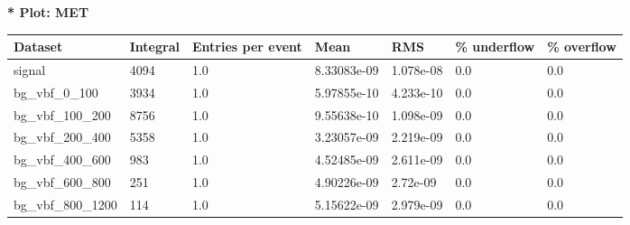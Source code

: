 \documentclass[a4paper, 10pt]{article}
\begin{document}
\textbf{* Plot: MET}\\
   \begin{table}[H]
  \begin{center}
    \begin{tabular}{|m{23.0mm}|m{23.0mm}|m{18.0mm}|m{19.0mm}|m{19.0mm}|m{19.0mm}|m{19.0mm}|}
      \hline
      {\cellcolor{yellow}         Dataset}& {\cellcolor{yellow}         Integral}& {\cellcolor{yellow}         Entries per event}& {\cellcolor{yellow}         Mean}& {\cellcolor{yellow}         RMS}& {\cellcolor{yellow}         \% underflow}& {\cellcolor{yellow}         \% overflow}\\
      \hline
      {\cellcolor{white}         signal}& {\cellcolor{white}         4094}& {\cellcolor{white}         1.0}& {\cellcolor{white}         8.33083e-09}& {\cellcolor{white}         1.078e-08}& {\cellcolor{green}         0.0}& {\cellcolor{green}         0.0}\\
      \hline
      {\cellcolor{white}         bg\_vbf\_0\_100}& {\cellcolor{white}         3934}& {\cellcolor{white}         1.0}& {\cellcolor{white}         5.97855e-10}& {\cellcolor{white}         4.233e-10}& {\cellcolor{green}         0.0}& {\cellcolor{green}         0.0}\\
      \hline
      {\cellcolor{white}         bg\_vbf\_100\_200}& {\cellcolor{white}         8756}& {\cellcolor{white}         1.0}& {\cellcolor{white}         9.55638e-10}& {\cellcolor{white}         1.098e-09}& {\cellcolor{green}         0.0}& {\cellcolor{green}         0.0}\\
      \hline
      {\cellcolor{white}         bg\_vbf\_200\_400}& {\cellcolor{white}         5358}& {\cellcolor{white}         1.0}& {\cellcolor{white}         3.23057e-09}& {\cellcolor{white}         2.219e-09}& {\cellcolor{green}         0.0}& {\cellcolor{green}         0.0}\\
      \hline
      {\cellcolor{white}         bg\_vbf\_400\_600}& {\cellcolor{white}         983}& {\cellcolor{white}         1.0}& {\cellcolor{white}         4.52485e-09}& {\cellcolor{white}         2.611e-09}& {\cellcolor{green}         0.0}& {\cellcolor{green}         0.0}\\
      \hline
      {\cellcolor{white}         bg\_vbf\_600\_800}& {\cellcolor{white}         251}& {\cellcolor{white}         1.0}& {\cellcolor{white}         4.90226e-09}& {\cellcolor{white}         2.72e-09}& {\cellcolor{green}         0.0}& {\cellcolor{green}         0.0}\\
      \hline
      {\cellcolor{white}         bg\_vbf\_800\_1200}& {\cellcolor{white}         114}& {\cellcolor{white}         1.0}& {\cellcolor{white}         5.15622e-09}& {\cellcolor{white}         2.979e-09}& {\cellcolor{green}         0.0}& {\cellcolor{green}         0.0}\\

\end{tabular}
\end{center}
\end{table}
\end{document}
